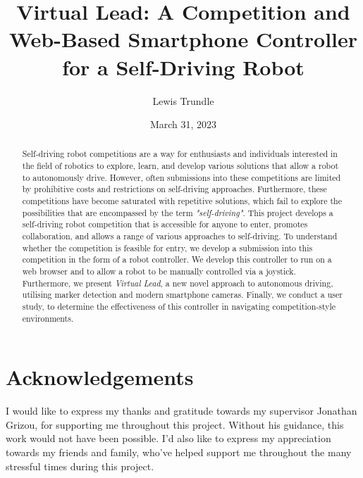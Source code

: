 \documentclass{l4proj}
\begin{document}
\title{Virtual Lead: A Competition and Web-Based Smartphone Controller for a Self-Driving Robot}
\author{Lewis Trundle}
\date{March 31, 2023}

\maketitle

\begin{abstract}
    Self-driving robot competitions are a way for enthusiasts and individuals interested in the field of robotics to explore, learn, and develop various solutions that allow a robot to autonomously drive. However, often submissions into these competitions are limited by prohibitive costs and restrictions on self-driving approaches. Furthermore, these competitions have become saturated with repetitive solutions, which fail to explore the possibilities that are encompassed by the term \textit{"self-driving"}. This project develops a self-driving robot competition that is accessible for anyone to enter, promotes collaboration, and allows a range of various approaches to self-driving. To understand whether the competition is feasible for entry, we develop a submission into this competition in the form of a robot controller. We develop this controller to run on a web browser and to allow a robot to be manually controlled via a joystick. Furthermore, we present \textit{Virtual Lead}, a new novel approach to autonomous driving, utilising marker detection and modern smartphone cameras. Finally, we conduct a user study, to determine the effectiveness of this controller in navigating competition-style environments.
\end{abstract}

\setcounter{page}{2}
\chapter*{Acknowledgements}
I would like to express my thanks and gratitude towards my supervisor Jonathan Grizou, for supporting me throughout this project. Without his guidance, this work would not have been possible. I'd also like to express my appreciation towards my friends and family, who've helped support me throughout the many stressful times during this project.
\end{document}
